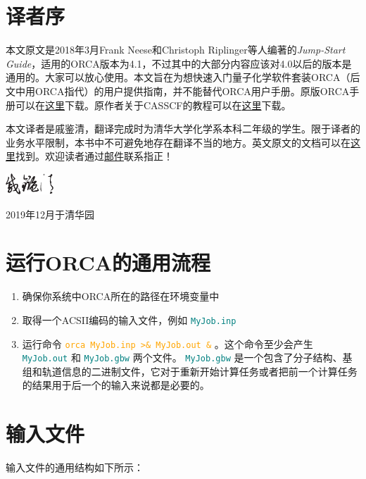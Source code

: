 \documentclass{ctexart}
\newcommand{\cmd}[1]{\textcolor{orange}{ \texttt{#1} }}
\newcommand{\file}[1]{\textcolor{teal}{ \texttt{#1} }}
\begin{document}
	


	\section*{译者序}
	本文原文是2018年3月Frank Neese和Christoph Riplinger等人编著的\textit{Jump-Start Guide}，适用的ORCA版本为4.1，不过其中的大部分内容应该对4.0以后的版本是通用的。大家可以放心使用。本文旨在为想快速入门量子化学软件套装ORCA（后文中用ORCA指代）的用户提供指南，并不能替代ORCA用户手册。原版ORCA手册可以在\href{https://hostr.co/ElQbdeKxt5jQ}{这里}下载。原作者关于CASSCF的教程可以在\href{https://hostr.co/0y7fujk5KEAa}{这里}下载。
	
	本文译者是戚鉴清，翻译完成时为清华大学化学系本科二年级的学生。限于译者的业务水平限制，本书中不可避免地存在翻译不当的地方。英文原文的文档可以在\href{https://hostr.co/i613jRFj7YNo}{这里}找到。欢迎读者通过\href{mailto:alexanderqi126@outlook.com}{邮件}联系指正！
		

	
	
	\begin{flushright}
		\includegraphics[width=1.8cm]{sign.eps}
		
		2019年12月于清华园
	\end{flushright}
	\newpage

			\tableofcontents
			\newpage
	
	\section{运行ORCA的通用流程}
	\begin{enumerate}[1.]
		\item 确保你系统中ORCA所在的路径在环境变量中
		\item 取得一个ACSII编码的输入文件，例如\file{MyJob.inp}
		\item 运行命令\cmd{orca MyJob.inp >\& MyJob.out \&}。这个命令至少会产生\file{MyJob.out}和\file{MyJob.gbw}两个文件。\file{MyJob.gbw}是一个包含了分子结构、基组和轨道信息的二进制文件，它对于重新开始计算任务或者把前一个计算任务的结果用于后一个的输入来说都是必要的。
	\end{enumerate}
	
	\section{输入文件}
	输入文件的通用结构如下所示：
	
\end{document}
